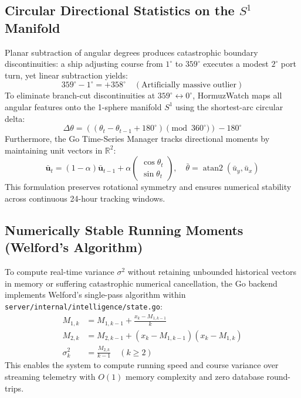 \subsection{Circular Directional Statistics on the \texorpdfstring{$S^1$}{S1} Manifold}
Planar subtraction of angular degrees produces catastrophic boundary discontinuities: a ship adjusting course from $1^\circ$ to $359^\circ$ executes a modest $2^\circ$ port turn, yet linear subtraction yields:
\begin{equation}
359^\circ - 1^\circ = +358^\circ \quad (\text{Artificially massive outlier})
\end{equation}
To eliminate branch-cut discontinuities at $359^\circ \leftrightarrow 0^\circ$, HormuzWatch maps all angular features onto the 1-sphere manifold \texorpdfstring{$S^1$}{S1} using the shortest-arc circular delta:
\begin{equation}
\Delta \theta = \left( (\theta_t - \theta_{t-1} + 180^\circ) \pmod{360^\circ} \right) - 180^\circ
\end{equation}
Furthermore, the Go Time-Series Manager tracks directional moments by maintaining unit vectors in $\mathbb{R}^2$:
\begin{equation}
\bar{\mathbf{u}}_t = (1 - \alpha) \bar{\mathbf{u}}_{t-1} + \alpha \begin{pmatrix} \cos \theta_t \\ \sin \theta_t \end{pmatrix}, \quad \bar{\theta} = \operatorname{atan2}(\bar{u}_{y}, \bar{u}_{x})
\end{equation}
This formulation preserves rotational symmetry and ensures numerical stability across continuous 24-hour tracking windows.

\subsection{Numerically Stable Running Moments (Welford's Algorithm)}
To compute real-time variance $\sigma^2$ without retaining unbounded historical vectors in memory or suffering catastrophic numerical cancellation, the Go backend implements Welford's single-pass algorithm within \texttt{server/internal/intelligence/state.go}:
\begin{align}
M_{1, k} &= M_{1, k-1} + \frac{x_k - M_{1, k-1}}{k} \\
M_{2, k} &= M_{2, k-1} + (x_k - M_{1, k-1})(x_k - M_{1, k}) \\
\sigma_k^2 &= \frac{M_{2, k}}{k - 1} \quad (k \ge 2)
\end{align}
This enables the system to compute running speed and course variance over streaming telemetry with $O(1)$ memory complexity and zero database round-trips.
